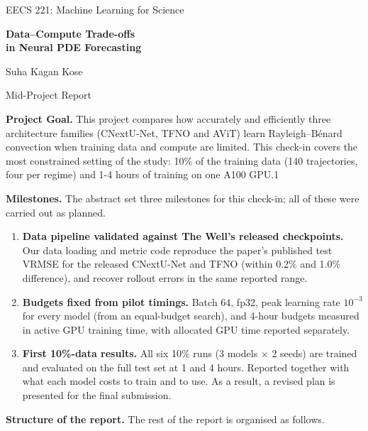 \documentclass[11pt]{article}
\makeatletter
\providecommand{\appendixcontents}{}
\newcommand{\compactcontents}{\begingroup\setlength{\parskip}{0pt}%
  \def\l@section##1##2{{\setlength\@tempdima{1.5em}\leftskip1.5em\rightskip\@pnumwidth\parfillskip-\@pnumwidth
    \parindent\z@\noindent{\bfseries ##1}\nobreak
    \leaders\hbox{$\m@th\mkern\@dotsep mu\hbox{.}\mkern\@dotsep mu$}\hfill
    \nobreak\hb@xt@\@pnumwidth{\hss ##2}\par}\vspace{1pt}}%
  \def\l@subsection##1##2{}%
  \def\appendixcontents{\vspace{3pt}{\leftskip1.5em\parindent\z@\noindent\bfseries Appendices\par}\vspace{1pt}}%
  \@starttoc{toc}\endgroup}
\makeatother
\begin{document}

\begin{center}
    {\large EECS 221: Machine Learning for Science\par}
    \vspace{5pt}
    {\LARGE\bfseries
    Data--Compute Trade-offs\\[3pt]
    in Neural PDE Forecasting\par}
    \vspace{7pt}
    {\Large Suha Kagan Kose\par}
    \vspace{6pt}
    {\large Mid-Project Report\par}
\end{center}

\textbf{Project Goal.} This project compares how accurately and efficiently three architecture families (CNextU-Net, TFNO and AViT) learn Rayleigh--B\'enard convection when training data and compute are limited. This check-in covers the most constrained setting of the study: 10\% of the training data (140 trajectories, four per regime) and 1-4 hours of training on one A100 GPU.1

\textbf{Milestones.} The abstract set three milestones for this check-in; all of these were carried out as planned.
\begin{enumerate}
    \item \textbf{Data pipeline validated against The Well's released checkpoints.}
    Our data loading and metric code reproduce the paper's published test VRMSE for the released CNextU-Net and
    TFNO (within 0.2\% and 1.0\% difference), and recover rollout errors in the same reported range.
    \item \textbf{Budgets fixed from pilot timings.} Batch 64, fp32, peak learning rate $10^{-3}$ for every
    model (from an equal-budget search), and 4-hour budgets measured in active GPU training time, with allocated
    GPU time reported separately.
    \item \textbf{First 10\%-data results.} All six 10\% runs (3 models $\times$ 2 seeds) are trained and
    evaluated on the full test set at 1 and 4 hours. Reported together with what each model costs to train and to use. As a result, a revised plan is presented for the final submission.
\end{enumerate}

\textbf{Structure of the report.} The rest of the report is organised as follows.\par\vspace{12pt}
\compactcontents
\end{document}
